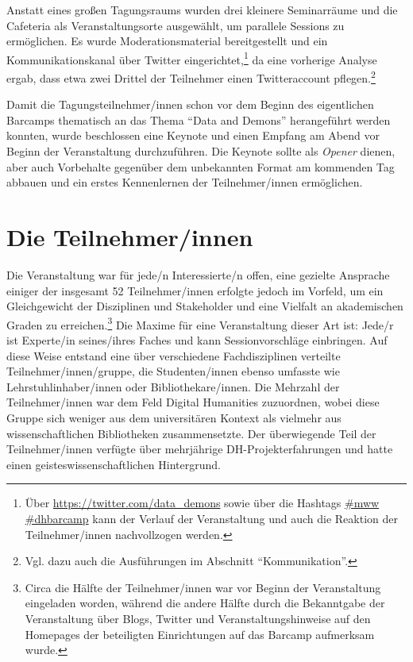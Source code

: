 \documentclass[a4paper,
fontsize=11pt,
oneside,
numbers=noperiodatend,
parskip=half-,
bibliography=totoc,
final
]{scrartcl}
\begin{document}
Anstatt eines großen Tagungsraums wurden drei kleinere Seminarräume und
die Cafeteria als Veranstaltungsorte ausgewählt, um parallele Sessions
zu ermöglichen. Es wurde Moderationsmaterial bereitgestellt und ein
Kommunikationskanal über Twitter eingerichtet,\footnote{Über
  \url{https://twitter.com/data_demons} sowie über die Hashtags
  \href{https://twitter.com/hashtag/mww?src=hash}{\#mww}
  \href{https://twitter.com/hashtag/dhbarcamp?src=hash}{\#dhbarcamp}
  kann der Verlauf der Veranstaltung und auch die Reaktion der
  Teilnehmer/innen nachvollzogen werden.} da eine vorherige Analyse
ergab, dass etwa zwei Drittel der Teilnehmer einen Twitteraccount
pflegen.\footnote{Vgl. dazu auch die Ausführungen im Abschnitt
  \enquote{Kommunikation}.}

Damit die Tagungsteilnehmer/innen schon vor dem Beginn des eigentlichen
Barcamps thematisch an das Thema \enquote{Data and Demons} herangeführt
werden konnten, wurde beschlossen eine Keynote und einen Empfang am
Abend vor Beginn der Veranstaltung durchzuführen. Die Keynote sollte als
\emph{Opener} dienen, aber auch Vorbehalte gegenüber dem unbekannten
Format am kommenden Tag abbauen und ein erstes Kennenlernen der
Teilnehmer/innen ermöglichen.

\hypertarget{die-teilnehmerinnen}{%
\section{Die Teilnehmer/innen}\label{die-teilnehmerinnen}}

Die Veranstaltung war für jede/n Interessierte/n offen, eine gezielte
Ansprache einiger der insgesamt 52 Teilnehmer/innen erfolgte jedoch im
Vorfeld, um ein Gleichgewicht der Disziplinen und Stakeholder und eine
Vielfalt an akademischen Graden zu erreichen.\footnote{Circa die Hälfte
  der Teilnehmer/innen war vor Beginn der Veranstaltung eingeladen
  worden, während die andere Hälfte durch die Bekanntgabe der
  Veranstaltung über Blogs, Twitter und Veranstaltungshinweise auf den
  Homepages der beteiligten Einrichtungen auf das Barcamp aufmerksam
  wurde.} Die Maxime für eine Veranstaltung dieser Art ist: Jede/r ist
Experte/in seines/ihres Faches und kann Sessionvorschläge einbringen.
Auf diese Weise entstand eine über verschiedene Fachdisziplinen
verteilte Teilnehmer/innen/gruppe, die Studenten/innen ebenso umfasste
wie Lehrstuhlinhaber/innen oder Bibliothekare/innen. Die Mehrzahl der
Teilnehmer/innen war dem Feld Digital Humanities zuzuordnen, wobei diese
Gruppe sich weniger aus dem universitären Kontext als vielmehr aus
wissenschaftlichen Bibliotheken zusammensetzte. Der überwiegende Teil
der Teilnehmer/innen verfügte über mehrjährige DH-Projekterfahrungen und
hatte einen geisteswissenschaftlichen Hintergrund.
\end{document}
